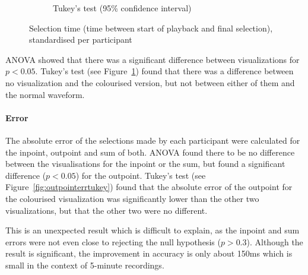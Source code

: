 \begin{figure}[ht]
\begin{subfigure}{.5\textwidth}
  \caption{Tukey's test (95\% confidence interval)}
  \label{fig:selecttimetukey}
\end{subfigure}
\caption{Selection time (time between start of playback and final selection), standardised per participant}
\label{fig:selecttime}
\end{figure}

ANOVA showed that there was a significant difference between visualizations for $p < 0.05$. Tukey's test (see
Figure~\ref{fig:selecttimetukey}) found that there was a difference between no visualization and the colourised version,
but not between either of them and the normal waveform.

\paragraph{Error}
The absolute error of the selections made by each participant were calculated for the inpoint, outpoint and sum of
both. ANOVA found there to be no difference between the visualisations for the inpoint or the sum, but found a
significant difference ($p < 0.05$) for the outpoint.  Tukey's test (see Figure~\ref{fig:outpointerrtukey}) found that
the absolute error of the outpoint for the colourised visualization was significantly lower than the other two
visualizations, but that the other two were no different.

This is an unexpected result which is difficult to explain, as the inpoint and sum errors were not even close to
rejecting the null hypothesis ($p > 0.3$).  Although the result is significant, the improvement in accuracy is only
about 150ms which is small in the context of 5-minute recordings.

